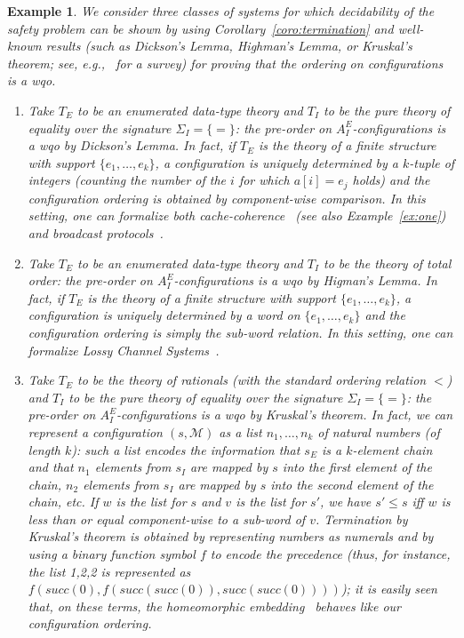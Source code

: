 \documentclass{LMCS}
\theoremstyle{plain}\newtheorem{assumption}[thm]{Assumption}
\theoremstyle{plain}\newtheorem{proposition}[thm]{Proposition}
\theoremstyle{plain}\newtheorem{property}[thm]{Property}
\theoremstyle{plain}\newtheorem{example}[thm]{Example}
\theoremstyle{plain}\newtheorem{claim}[thm]{Claim}
\theoremstyle{plain}\newtheorem{lemma}[thm]{Lemma}
\begin{document}
\begin{example}\em
  We consider three classes of systems for which decidability of the
  safety problem can be shown by using
  Corollary~\ref{coro:termination} and well-known results (such as
  Dickson's Lemma, Highman's Lemma, or Kruskal's theorem; see,
  e.g.,~\cite{gallier} for a survey) for proving that the ordering on
  configurations is a wqo.
  \begin{enumerate}[$\bullet$]
  \item Take $T_E$ to be an enumerated data-type theory and $T_I$ to
    be the pure theory of equality over the signature
    $\Sigma_I=\{=\}$: the pre-order on $A_I^E$-configurations is a wqo
    by Dickson's Lemma.  In fact, if $T_E$ is the theory of a finite
    structure with support $\{e_1, \dots, e_k\}$, a configuration is
    uniquely determined by a $k$-tuple of integers (counting the
    number of the $i$ for which $a[i]=e_j$ holds) and the
    configuration ordering is obtained by component-wise comparison.
    In this setting, one can formalize both
    cache-coherence~\cite{cav-delzanno} (see also
    Example~\ref{ex:one}) and broadcast protocols~\cite{bro1,bro2}.
  \item Take $T_E$ to be an enumerated data-type theory and $T_I$ to be
    the theory of total order: the pre-order on $A_I^E$-configurations
    is a wqo by Higman's Lemma.  In fact, if $T_E$ is the theory of a
    finite structure with support $\{e_1, \dots, e_k\}$, a
    configuration is uniquely determined by a word on $\{e_1, \dots,
    e_k\}$ and the configuration ordering is simply the sub-word
    relation.  In this setting, one can formalize Lossy Channel
    Systems~\cite{lossy-channels,lossy2}.
  \item Take $T_E$ to be the theory of rationals (with the standard
    ordering relation $<$) and $T_I$ to be the pure theory of equality
    over the signature $\Sigma_I=\{=\}$: the pre-order on
    $A_I^E$-configurations is a wqo by Kruskal's theorem.  In fact, we
    can represent a configuration $(s, \mathcal M)$ as a list $n_1,
    \dots, n_k$ of natural numbers (of length $k$): such a list
    encodes the information that $s_E$ is a $k$-element chain and that
    $n_1$ elements from $s_I$ are mapped by $s$ into the first element
    of the chain, $n_2$ elements from $s_I$ are mapped by $s$ into the
    second element of the chain, etc.  If $w$ is the list for $s$ and
    $v$ is the list for $s'$, we have $s'\leq s$ iff $w$ is less than
    or equal component-wise to a sub-word of $v$.  Termination by
    Kruskal's theorem is obtained by representing numbers as numerals
    and by using a binary function symbol $f$ to encode the precedence
    (thus, for instance, the list 1,2,2 is represented as $f(succ(0),
    f(succ(succ(0)), succ(succ(0))))$); it is easily seen that, on these terms,
the homeomorphic embedding~\cite{BaaNi} behaves like our configuration
    ordering.
  \end{enumerate}
\end{example}
\end{document}
